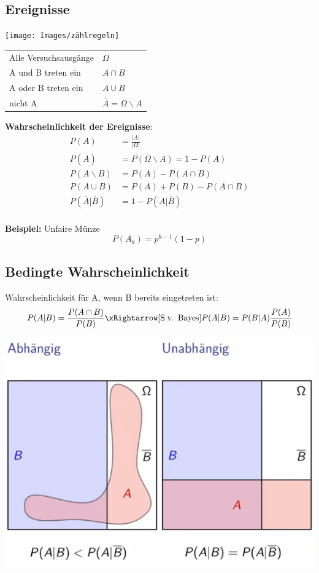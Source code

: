 \subsection{Ereignisse}

\texttt{[image: Images/zählregeln]}

\begin{table}[H]
	\centering
	\begin{tabular}{l|l}
		Alle Versuchsausgänge & $\Omega$ \\
		A und B treten ein & $A \cap B$ \\
		A oder B treten ein & $A \cup B$ \\
		nicht A & $\overline{A} = \Omega \backslash A$
	\end{tabular}
\end{table}

\textbf{Wahrscheinlichkeit der Ereignisse}:\\
\begin{align*}
	P(A) &= \frac{\left|A\right|}{\left|\Omega\right|}\\
	P(\overline{A}) &= P(\Omega \backslash A) = 1 - P(A) \\
	P(A \backslash B) &= P(A) - P(A \cap B) \\
	P(A \cup B) &= P(A)  + P(B) - P(A \cap B) \\
	P(\overline{A} | \overline{B}) &= 1-P(A|\overline{B}) \\
\end{align*}


\textbf{Beispiel:} Unfaire Münze
\[P(A_k) = p^{k-1}(1-p)\]


\subsection{Bedingte Wahrscheinlichkeit}
Wahrscheinlichkeit für A, wenn B bereits eingetreten ist:
\[
P(A|B) = \frac{P(A \cap B)}{P(B)} \xRightarrow[\text{S.v. Bayes}]{} P(A|B) = P(B|A)\frac{P(A)}{P(B)}
\]

\begin{center}
	\includegraphics[width=0.5\columnwidth]{Images/bedingte_wahr.}
\end{center}

